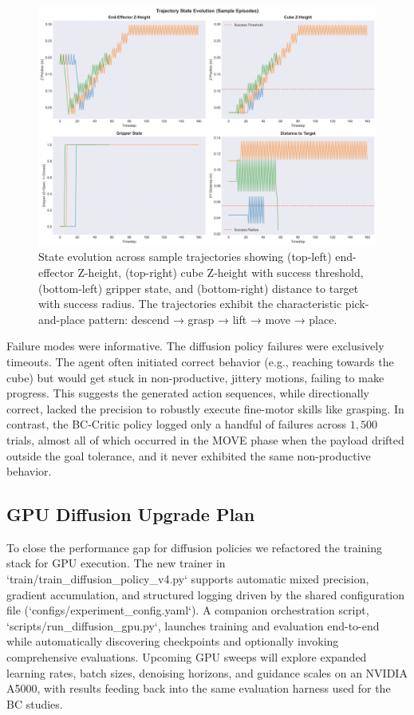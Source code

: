 \documentclass[conference]{IEEEtran}
\begin{document}
\begin{figure}[t]
\centering
\includegraphics[width=\textwidth]{trajectory_evolution.png}
\caption{State evolution across sample trajectories showing (top-left) end-effector Z-height, (top-right) cube Z-height with success threshold, (bottom-left) gripper state, and (bottom-right) distance to target with success radius. The trajectories exhibit the characteristic pick-and-place pattern: descend → grasp → lift → move → place.}
\label{fig:trajectory}
\end{figure}

Failure modes were informative. The diffusion policy failures were exclusively timeouts. The agent often initiated correct behavior (e.g., reaching towards the cube) but would get stuck in non-productive, jittery motions, failing to make progress. This suggests the generated action sequences, while directionally correct, lacked the precision to robustly execute fine-motor skills like grasping. In contrast, the BC-Critic policy logged only a handful of failures across $1{,}500$ trials, almost all of which occurred in the MOVE phase when the payload drifted outside the goal tolerance, and it never exhibited the same non-productive behavior.

\subsection{GPU Diffusion Upgrade Plan}\label{sec:diff_future}

To close the performance gap for diffusion policies we refactored the training stack for GPU execution. The new trainer in `train/train_diffusion_policy_v4.py` supports automatic mixed precision, gradient accumulation, and structured logging driven by the shared configuration file (`configs/experiment_config.yaml`). A companion orchestration script, `scripts/run_diffusion_gpu.py`, launches training and evaluation end-to-end while automatically discovering checkpoints and optionally invoking comprehensive evaluations. Upcoming GPU sweeps will explore expanded learning rates, batch sizes, denoising horizons, and guidance scales on an NVIDIA A5000, with results feeding back into the same evaluation harness used for the BC studies.
\end{document}
